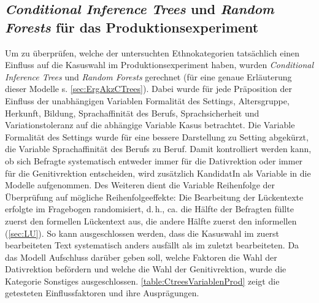 \subsection{\textit{Conditional Inference Trees} und \textit{Random Forests} für das Produktionsexperiment}
\label{sec:ErgProdCTrees}
Um zu überprüfen, welche der untersuchten Ethnokategorien tatsächlich einen Einfluss auf die Kasuswahl im Produktionsexperiment haben, wurden \textit{Conditional Inference Trees} und \textit{Random Forests} gerechnet (für eine genaue Erläuterung dieser Modelle s. \autoref{sec:ErgAkzCTrees}). 
Dabei wurde für jede Präposition der Einfluss der unabhängigen Variablen \glqq Formalität des Settings\grqq, \glqq Altersgruppe\grqq, \glqq Herkunft\grqq{}, \glqq Bildung\grqq, \glqq Sprachaffinität des Berufs\grqq, \glqq Sprachsicherheit\grqq{} und \glqq Variationstoleranz\grqq{} auf die abhängige Variable \glqq Kasus\grqq{} betrachtet. 
Die Variable \glqq Formalität des Settings\grqq{} wurde für eine bessere Darstellung zu \glqq Setting\grqq{} abgekürzt, die Variable \glqq Sprachaffinität des Berufs\grqq{} zu \glqq Beruf\grqq{}. 
Damit kontrolliert werden kann, ob sich Befragte systematisch entweder immer für die Dativrektion oder immer für die Genitivrektion entscheiden, wird zusätzlich \glqq KandidatIn\grqq{} als Variable in die Modelle aufgenommen. 
Des Weiteren dient die Variable \glqq Reihenfolge\grqq{} der Überprüfung auf mögliche Reihenfolgeeffekte: 
Die Bearbeitung der Lückentexte erfolgte im Fragebogen randomisiert, d.\,h., ca. die Hälfte der Befragten füllte zuerst den formellen Lückentext aus, die andere Hälfte zuerst den informellen (\autoref{sec:LU}). 
So kann ausgeschlossen werden, dass die Kasuswahl im zuerst bearbeiteten Text systematisch anders ausfällt als im zuletzt bearbeiteten.          
Da das Modell Aufschluss darüber geben soll, welche Faktoren die Wahl der Dativrektion befördern und welche die Wahl der Genitivrektion, wurde die Kategorie \glqq Sonstiges\grqq{} ausgeschlossen. 
\autoref{table:CtreesVariablenProd} zeigt die getesteten Einflussfaktoren und ihre Ausprägungen. 
